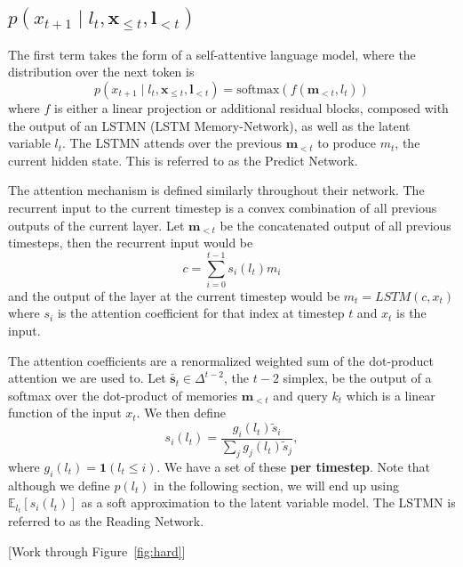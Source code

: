 \documentclass{article}
\newcommand\Es[2]{\mathbb{E}_{#1}\left[#2\right]}
\newcommand{\bl}{\mathbf{l}}
\newcommand{\bx}{\mathbf{x}}
\begin{document}
\subsection{$p(x_{t+1}\mid l_t,\bx_{\le t},\bl_{<t})$}
The first term takes the form of a self-attentive language model,
where the distribution over the next token is
$$p(x_{t+1}\mid l_t,\bx_{\le t},\bl_{<t}) = \textrm{softmax}(f(\bm{m}_{<t}, l_t))$$
where $f$ is either a linear projection or additional residual blocks,
composed with the output of an LSTMN (LSTM Memory-Network),
as well as the latent variable $l_t$.
The LSTMN attends over the previous $\bm{m}_{<t}$ to produce $m_t$,
the current hidden state.
This is referred to as the Predict Network.

The attention mechanism is defined similarly throughout their network.
The recurrent input to the current timestep is a convex combination of
all previous outputs of the current layer.
Let $\bm{m}_{<t}$ be the concatenated output of all previous timesteps,
then the recurrent input would be
\begin{equation}c = \sum_{i=0}^{t-1} s_i(l_t) m_i\end{equation}
and the output of the layer at the current timestep would be
$m_t = LSTM(c, x_t)$ where $s_i$ is the attention coefficient
for that index at timestep $t$ and $x_t$ is the input.

The attention coefficients are a renormalized weighted sum of
the dot-product attention we are used to.
Let $\tilde{\bm{s}_t}\in\Delta^{t-2}$, the $t-2$ simplex, be the output of a softmax over
the dot-product of memories $\bm{m}_{<t}$ and query $k_t$
which is a linear function of the input $x_t$.
We then define
\begin{equation}s_i(l_t) = \frac{g_i(l_t)\tilde{s}_i}{\sum_jg_j(l_t)\tilde{s}_j},\end{equation}
where $g_i(l_t) = \mathbf{1}(l_t \le i)$.
We have a set of these \textbf{per timestep}.
Note that although we define $p(l_t)$ in the following section,
we will end up using $\Es{l_t}{s_i(l_t)}$ as a soft approximation to the
latent variable model.
The LSTMN is referred to as the Reading Network.

[Work through Figure~\ref{fig:hard}]
\end{document}

